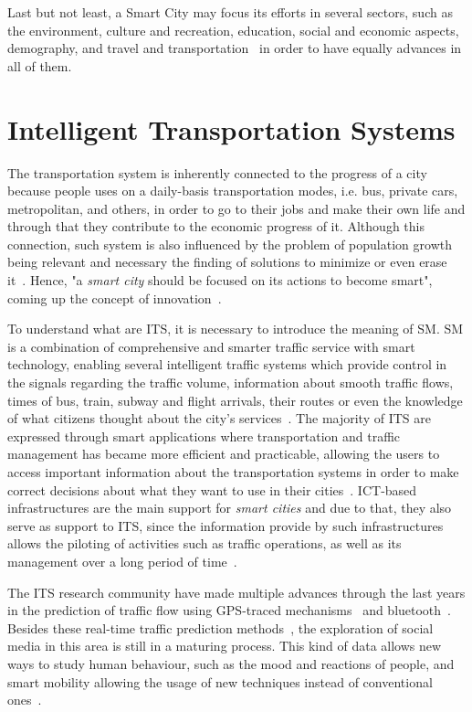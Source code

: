Last but not least, a Smart City may focus its efforts in several sectors, such as the environment, culture and recreation, education, social and economic aspects, demography, and travel and transportation~\cite{caragliu2011smart} in order to have equally advances in all of them.

\section{Intelligent Transportation Systems}\label{sec:intelligent_transportation_systems}

The transportation system is inherently connected to the progress of a city because people uses on a daily-basis transportation modes, i.e. bus, private cars, metropolitan, and others, in order to go to their jobs and make their own life and through that they contribute to the economic progress of it. Although this connection, such system is also influenced by the problem of population growth being relevant and necessary the finding of solutions to minimize or even erase it~\cite{kn:Caragliu2015}. Hence, "a \textit{smart city} should be focused on its actions to become smart", coming up the concept of innovation~\cite{ulloa2016mining}.

To understand what are \gls{ITS}, it is necessary to introduce the meaning of \gls{SM}. \gls{SM} is a combination of comprehensive and smarter traffic service with smart technology, enabling several intelligent traffic systems which provide control in the signals regarding the traffic volume, information about smooth traffic flows, times of bus, train, subway and flight arrivals, their routes or even the knowledge of what citizens thought about the city's services~\cite{kn:Chun2015}. The majority of \gls{ITS} are expressed through smart applications where transportation and traffic management has became more efficient and practicable, allowing the users to access important information about the transportation systems in order to make correct decisions about what they want to use in their cities~\cite{kn:Caragliu2015}. \gls{ICT}-based infrastructures are the main support for \textit{smart cities} and due to that, they also serve as support to \gls{ITS}, since the information provide by such infrastructures allows the piloting of activities such as traffic operations, as well as its  management over a long period of time~\cite{ulloa2016mining}.

The \gls{ITS} research community have made multiple advances through the last years in the prediction of traffic flow using GPS-traced mechanisms~\cite{sandim2016using} and bluetooth~\cite{filgueiras2014sensing}. Besides these real-time traffic prediction methods~\cite{barros2015short}, the exploration of social media in this area is still in a maturing process. This kind of data allows new ways to study human behaviour, such as the mood and reactions of people, and smart mobility allowing the usage of new techniques instead of conventional ones~\cite{liu2013understanding}.

